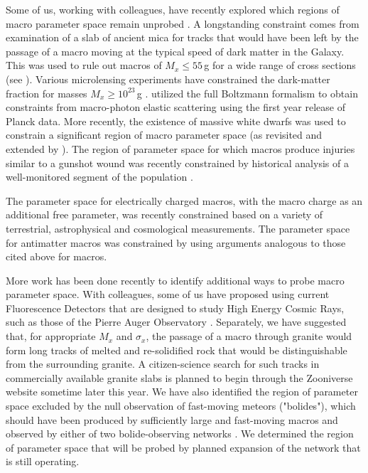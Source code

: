 \documentclass[%
reprint,
 amsmath,amssymb,
 aps,
 prd,
]{revtex4-2}
\begin{document}
    Some of us, working with colleagues, have recently explored which regions of macro parameter space remain unprobed \cite{jacobs2015macro, jacobs2015resonant, Sidhu2019death, Sidhu2019bolide, Sidhu2020reconsider}. A longstanding constraint comes from examination of a slab of ancient mica for tracks that would have been left by the passage of a macro moving at the typical speed of dark matter in the Galaxy. This was used to rule out macros of $M_x \leq 55\,$g for a wide range of cross sections (see \cite{Price1988ge, DeRujula1984axn, jacobs2015macro}). Various microlensing experiments have constrained the dark-matter fraction  for masses $M_x \geq 10^{23}\,$g \cite{Alcock2001, Griest2013, Tisserand2007, Carr2010,Niikura2019}. \citeauthor{Wilkinson2014angular} \citep{Wilkinson2014angular} utilized the full Boltzmann formalism to obtain constraints from macro-photon elastic scattering using the first year release of Planck data. More recently, the existence of massive white dwarfs was used to constrain a significant region of macro parameter space \cite{Graham2018} (as revisited and extended by \cite{Sidhu2020reconsider}). The region of parameter space for which macros produce injuries similar to a gunshot wound was recently constrained by historical analysis of a well-monitored segment of the population \cite{Sidhu2019death}.

    The parameter space for electrically charged macros, with the macro charge as an additional free parameter, was recently constrained \cite{Sidhu2020charge} based on a variety of terrestrial, astrophysical and cosmological measurements. The parameter space for antimatter macros was constrained by \cite{Sidhu2020anti} using arguments analogous to those cited above for macros.

    More work has been done recently to identify additional ways to probe macro parameter space. With colleagues, some of us have proposed \cite{Sidhu2018auv} using current Fluorescence Detectors that are designed to study High Energy Cosmic Rays, such as those of the Pierre Auger Observatory \cite{Abraham2010}. Separately, we have suggested  \cite{Sidhu2019granite} that, for appropriate $M_x$ and $\sigma_x$, the passage of a macro through granite would form long tracks of melted and re-solidified rock that would be distinguishable from the surrounding granite. A citizen-science search for such tracks in commercially available granite slabs is planned to begin through the Zooniverse website sometime later this year. We have also identified the region of parameter space excluded by the null observation of fast-moving meteors ("bolides"), which should have been produced by sufficiently large and fast-moving macros and observed by either of two  bolide-observing networks \cite{Sidhu2019bolide}. We determined the region of parameter space that will be probed by planned expansion of the network that is still operating.
\end{document}
